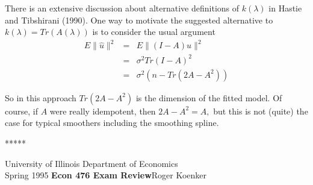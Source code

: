 There is an extensive discussion about alternative definitions of 
$k(\lambda)$ in Hastie and Tibshirani (1990).  One way to motivate the 
suggested alternative to $k(\lambda) = Tr(A(\lambda))$ is to consider 
the usual argument
\begin{eqnarray*}
E\parallel\hat u\parallel^2 &=& E\parallel (I-A)u\parallel^2 \\
&=& \sigma^2 Tr (I-A)^2 \\
&=& \sigma^2 (n-Tr (2A-A^2))
\end{eqnarray*}

So in this approach $Tr (2A-A^2)$ is the dimension of the fitted model.
Of course, if $A$ were really idempotent, then $2A-A^2=A,$ but this 
is not (quite) the case for typical smoothers including the smoothing
spline.


\vspace{10mm} 
\begin{center} 
***** 
\end{center} 

\noindent
University of Illinois \hfill Department of Economics \\
Spring 1995 \hfill \large{{\bf Econ 476 Exam Review}}\hfill Roger Koenker


